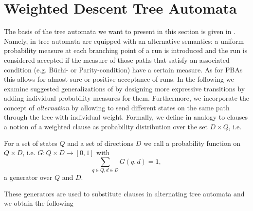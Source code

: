\section{Weighted Descent Tree Automata}
\label{sec:wdta}
The basis of the tree automata we want to present in this section is given in
\cite{RandAutoInfTrees}. Namely, in \cite{RandAutoInfTrees} tree automata are
equipped with an alternative semantics: a uniform probability measure at each
branching point of a run is introduced and the run is considered accepted if
the measure of those paths that satisfy an associated condition (e.g. Büchi- or
Parity-condition) have a certain measure. As for \acp{PBA} this allows for
almost-sure or positive acceptance of runs. In the following we examine
suggested generalizations of \cite{RandAutoInfTrees} by designing 
more expressive transitions by adding individual probability measures for them.
Furthermore, we incorporate the concept of \emph{alternation} by allowing to 
send different states on the same path through the tree with individual weight.
Formally, we define in analogy to clauses a notion of a weighted clause as
probability distribution over the set $D\times Q$, i.e.
\begin{definition}[Generator]
  For a set of states $Q$ and a set of directions $D$ we call a probability
  function on $Q\times D$, i.e. $G: Q\times D\rightarrow [0,1]$ with
  \begin{equation*}
    \sum\limits_{q\in Q,d\in D}G(q,d) = 1,
  \end{equation*} 
  a generator over $Q$ and $D$. 
\end{definition}
These generators are used to substitute clauses in alternating tree
automata and we obtain the following
